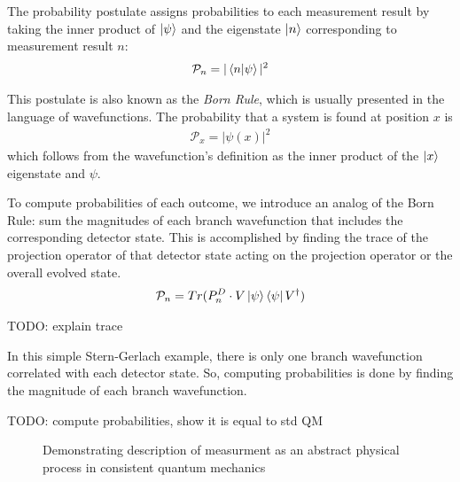 The probability postulate assigns probabilities to each measurement result by taking the inner product of $\ket{\psi}$ and the eigenstate $\ket{n}$ corresponding to measurement result $n$:
\begin{align}
    \mathcal{P}_n = |\braket{n|\psi}|^2
\end{align}

This postulate is also known as the \textit{Born Rule}, which is usually presented in the language of wavefunctions. The probability that a system is found at position $x$ is
\begin{align}
    \mathcal{P}_x = |\psi(x)|^2
\end{align}
which follows from the wavefunction's definition as the inner product of the $\ket{x}$ eigenstate and $\psi$.



To compute probabilities of each outcome, we introduce an analog of the Born Rule: sum the magnitudes of each branch wavefunction that includes the corresponding detector state. This is accomplished by finding the trace of the projection operator of that detector state acting on the projection operator or the overall evolved state.
\begin{align}
    \mathcal{P}_n = Tr(P^D_n \cdot V\ket{\psi}\bra{\psi}V^\dagger)
\end{align}

TODO: explain trace

In this simple Stern-Gerlach example, there is only one branch wavefunction correlated with each detector state. So, computing probabilities is done by finding the magnitude of each branch wavefunction.

TODO: compute probabilities, show it is equal to std QM

\begin{figure}
\centering\CaptionFontSize
{}
\caption[Insert an abbreviated caption here to show in the List of Figures]
{Demonstrating description of measurment as an abstract physical process in consistent quantum mechanics}
\label{Figure:Intro:FigureExampleB}
\end{figure}

